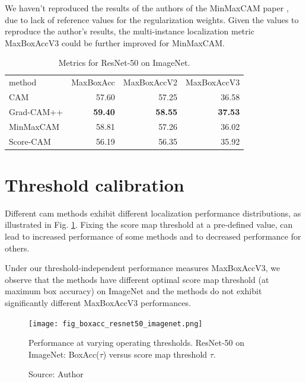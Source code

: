 We haven't reproduced the results of the authors of the MinMaxCAM paper \cite{wang2021minmaxcam}, due to lack of reference values for the regularization weights. Given the values to reproduce the author's results, the multi-instance localization metric MaxBoxAccV3 could be further improved for MinMaxCAM.

\begin{table}[ht]
\centering
\begin{tabular}{lrrr}
\toprule
method & MaxBoxAcc & MaxBoxAccV2 & MaxBoxAccV3 \\
\cmidrule(lr){1-1} \cmidrule(lr){2-4}
CAM & 57.60 & 57.25 & 36.58 \\
Grad-CAM++ & \bfseries 59.40 & \bfseries 58.55 & \bfseries 37.53 \\
MinMaxCAM & 58.81 & 57.26 & 36.02 \\
Score-CAM & 56.19 & 56.35 & 35.92 \\
\bottomrule
\end{tabular}
\caption[Metrics for ResNet-50 on ImageNet]{Metrics for ResNet-50 on ImageNet.}
\label{tab:metrics_resnet50_imagenet}
\end{table}


\section{Threshold calibration}
Different \acrshort{cam} methods exhibit different localization performance distributions, as illustrated in Fig. \ref{fig:boxacc_resnet50_imagenet}. Fixing the score map threshold at a pre-defined value, can lead to increased performance of some methods and to decreased performance for others. 

Under our threshold-independent performance measures MaxBoxAccV3, we observe that the methods have different optimal score map threshold (at maximum box accuracy) on ImageNet and the methods do not exhibit significantly different MaxBoxAccV3 performances.

\begin{figure}[ht]
    \begin{center}       
    \texttt{[image: fig\_boxacc\_resnet50\_imagenet.png]}
    \caption[BoxAcc for ResNet-50 on ImageNet]{Performance at varying operating thresholds. ResNet-50 on ImageNet: BoxAcc($\tau$) versus score map threshold $\tau$.}
    \caption*{Source: Author}
    \label{fig:boxacc_resnet50_imagenet}
    \end{center}
\end{figure}

